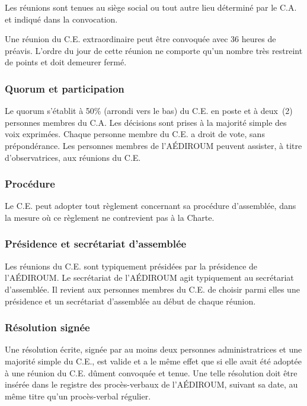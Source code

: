 \documentclass{aediroum}
\begin{document}
Les réunions sont tenues au siège social ou tout autre lieu déterminé par le C.A. et indiqué dans la convocation.

Une réunion du C.E. extraordinaire peut être convoquée avec 36 heures de préavis. L'ordre du jour de cette réunion ne comporte qu'un nombre très restreint de points et doit demeurer fermé.

\subsubsection{Quorum et participation}\label{sec:quorum-et-participation}

Le quorum s'établit à 50\% (arrondi vers le bas) du C.E. en poste et à deux~(2) personnes membres du C.A. Les décisions sont prises à la majorité simple des voix exprimées. Chaque personne membre du C.E. a droit de vote, sans prépondérance. Les personnes membres de l'AÉDIROUM peuvent assister, à titre d'observatrices, aux réunions du C.E.

\subsubsection{Procédure}\label{sec:procedure-admin}

Le C.E. peut adopter tout règlement concernant sa procédure d'assemblée, dans la mesure où ce règlement ne contrevient pas à la Charte.

\subsubsection{Présidence et secrétariat d'assemblée}\label{sec:president-et-secretaire-dassemblee}

Les réunions du C.E. sont typiquement présidées par la présidence de l'AÉDIROUM. Le secrétariat de l'AÉDIROUM agit typiquement au secrétariat d’assemblée. Il revient aux personnes membres du C.E. de choisir parmi elles une présidence et un secrétariat d'assemblée au début de chaque réunion.

\subsubsection{Résolution signée}\label{sec:resolution-signee}

Une résolution écrite, signée par au moins deux personnes administratrices et une majorité simple du C.E., est valide et a le même effet que si elle avait été adoptée à une réunion du C.E. dûment convoquée et tenue. Une telle résolution doit être insérée dans le registre des procès-verbaux de l'AÉDIROUM, suivant sa date, au même titre qu'un procès-verbal régulier.
\end{document}
